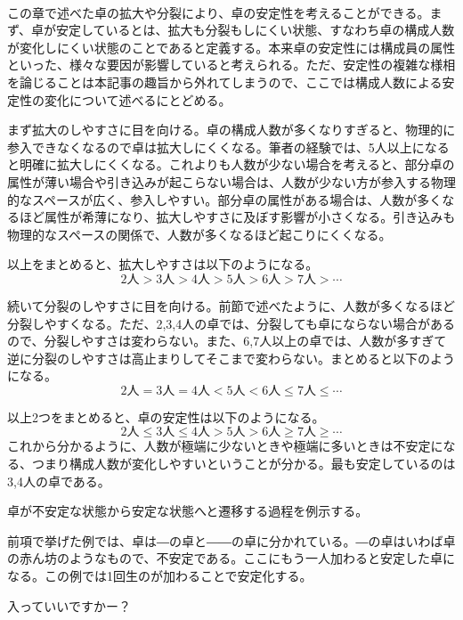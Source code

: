 \begin{multicols}{2}
\\
この章で述べた卓の拡大や分裂により、卓の安定性を考えることができる。まず、卓が安定しているとは、拡大も分裂もしにくい状態、すなわち卓の構成人数が変化しにくい状態のことであると定義する。本来卓の安定性には構成員の属性といった、様々な要因が影響していると考えられる。ただ、安定性の複雑な様相を論じることは本記事の趣旨から外れてしまうので、ここでは構成人数による安定性の変化について述べるにとどめる。
\par
まず拡大のしやすさに目を向ける。卓の構成人数が多くなりすぎると、物理的に参入できなくなるので卓は拡大しにくくなる。筆者の経験では、5人以上になると明確に拡大しにくくなる。これよりも人数が少ない場合を考えると、部分卓の属性が薄い場合や引き込みが起こらない場合は、人数が少ない方が参入する物理的なスペースが広く、参入しやすい。部分卓の属性がある場合は、人数が多くなるほど属性が希薄になり、拡大しやすさに及ぼす影響が小さくなる。引き込みも物理的なスペースの関係で、人数が多くなるほど起こりにくくなる。
\par
以上をまとめると、拡大しやすさは以下のようになる。
\begin{equation*}
  2人>3人>4人>5人>6人>7人>\cdots
\end{equation*}
\par
続いて分裂のしやすさに目を向ける。前節で述べたように、人数が多くなるほど分裂しやすくなる。ただ、2,3,4人の卓では、分裂しても卓にならない場合があるので、分裂しやすさは変わらない。また、6,7人以上の卓では、人数が多すぎて逆に分裂のしやすさは高止まりしてそこまで変わらない。まとめると以下のようになる。
\begin{equation*}
  2人=3人=4人<5人<6人\leq7人\leq\cdots
\end{equation*}
\par
以上2つをまとめると、卓の安定性は以下のようになる。
\begin{equation*}
  2人\leq3人\leq4人>5人>6人\geq7人\geq\cdots
\end{equation*}
これから分かるように、人数が極端に少ないときや極端に多いときは不安定になる、つまり構成人数が変化しやすいということが分かる。最も安定しているのは3,4人の卓である。
\par
卓が不安定な状態から安定な状態へと遷移する過程を例示する。
\par
\dotfill
\par
前項で挙げた例では、卓は―の卓と――の卓に分かれている。―の卓はいわば卓の赤ん坊のようなもので、不安定である。ここにもう一人加わると安定した卓になる。この例では1回生のが加わることで安定化する。
\par
{}
入っていいですかー？


\end{multicols}
